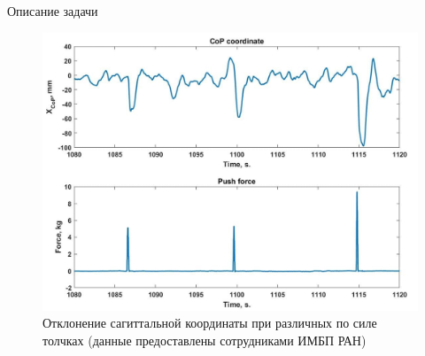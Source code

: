 \documentclass[10pt]{beamer}
\begin{document}
\begin{frame}{Описание задачи}
\begin{figure}[h!]
\begin{center}
\begin{minipage}[h]{0.66\linewidth}
				\includegraphics[width=1\linewidth]{images/Pushes.png}
				{\footnotesize
					\caption{Отклонение сагиттальной координаты при различных по силе толчках (данные предоставлены сотрудниками ИМБП РАН) }
				}
			\end{minipage}
		\end{center}
	\end{figure}
\end{frame}
\end{document}
